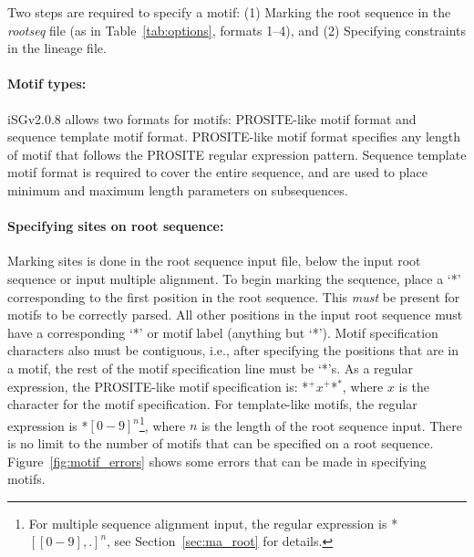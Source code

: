 \documentclass[10pt]{article}
\newcommand{\version}{2.0.8 }
\newcommand{\iSGcurrentshort}{iSGv\version }
\begin{document}
 Two steps are required to specify a motif: (1) Marking the root sequence in the \textit{rootseq} file (as in Table~\ref{tab:options}, formats 1--4), and (2) Specifying constraints in the lineage file. 

  \paragraph{Motif types:} \iSGcurrentshort allows two formats for motifs: PROSITE-like motif format and sequence template motif format. PROSITE-like motif format specifies any length of motif that follows the PROSITE regular expression pattern. Sequence template motif format is required to cover the entire sequence, and are used to place minimum and maximum length parameters on subsequences.
 
  \paragraph{Specifying sites on root sequence:} Marking sites is done in the root sequence input file, below the input root sequence or input multiple alignment. To begin marking the sequence, place a `*' corresponding to the first position in the root sequence. This \emph{must} be present for motifs to be correctly parsed. All other positions in the input root sequence must have a corresponding `*' or motif label (anything but `*'). Motif specification characters also must be contiguous, i.e., after specifying the positions that are in a motif, the rest of the motif specification line must be `*'s. As a regular expression, the PROSITE-like motif specification is: *$^+x^+$*$^*$, where $x$ is the character for the motif specification. For template-like motifs, the regular expression is *$[0-9]^n$\footnote{For multiple sequence alignment input, the regular expression is *$[[0-9],.]^n$, see Section~\ref{sec:ma_root} for details.}, where $n$ is the length of the root sequence input. There is no limit to the number of motifs that can be specified on a root sequence. Figure~\ref{fig:motif_errors} shows some errors that can be made in specifying motifs.
  
\end{document}

